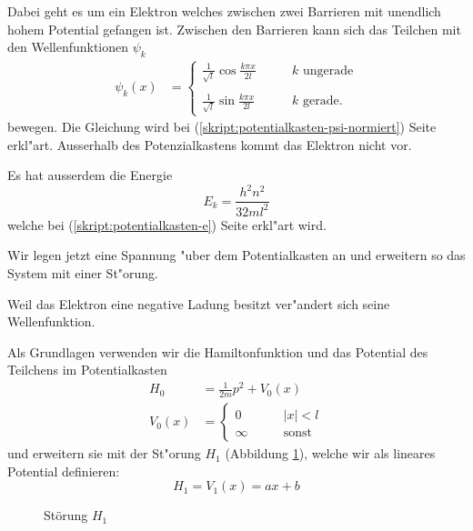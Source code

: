 \begin{refsection}
Dabei geht es um ein Elektron welches zwischen zwei Barrieren mit unendlich hohem Potential gefangen ist.
Zwischen den Barrieren kann sich das Teilchen mit den Wellenfunktionen $\psi_k$
\begin{align}
\psi_k(x)
&=
\begin{cases}
\displaystyle
\frac{1}{\sqrt{l}}\cos\frac{k \pi x}{2l}&\qquad \text{$k$ ungerade}\\
\\
\displaystyle
\frac{1}{\sqrt{l}}\sin\frac{k \pi x}{2l}&\qquad \text{$k$ gerade}.
\end{cases}
\end{align}
bewegen.
Die Gleichung wird bei (\ref{skript:potentialkasten-psi-normiert}) Seite \pageref{skript:potentialkasten-psi-normiert} erkl"art.
Ausserhalb des Potenzialkastens kommt das Elektron nicht vor.

Es hat ausserdem die Energie
\[
E_k = \frac{h^2n^2}{32ml^2}
\]
welche bei (\ref{skript:potentialkasten-e})
Seite \pageref{skript:potentialkasten-e} erkl"art wird.

Wir legen jetzt eine Spannung "uber dem Potentialkasten an
und erweitern so das System mit einer St"orung.

Weil das Elektron eine negative Ladung besitzt ver"andert sich seine Wellenfunktion.

Als Grundlagen verwenden wir die Hamiltonfunktion und das Potential des Teilchens im Potentialkasten
\begin{equation}
\begin{aligned}
H_0&=\frac1{2m}p^2+V_0(x)
\\
V_0(x)&=
  \begin{cases}
    0       & \qquad |x|<l\\
    \infty  & \qquad\text{sonst}
  \end{cases}
\end{aligned}
\end{equation}
und erweitern sie mit der St"orung $H_1$ (Abbildung \ref{abb:efeld_H_1}), welche wir als lineares 
Potential definieren:
\begin{equation}
  H_1 = V_1(x) = a x + b
\end{equation}

\begin{figure}
  \centering
{}
 \caption{St\"orung $H_1$}
 \label{abb:efeld_H_1}
\end{figure}


\end{refsection}
